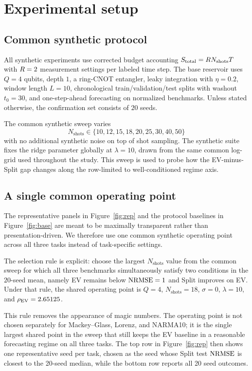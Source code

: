 \section{Experimental setup}
\label{sec:setup}

\subsection{Common synthetic protocol}

All synthetic experiments use corrected budget accounting $S_{\mathrm{total}}=R N_{\mathrm{shots}} T$ with $R=2$ measurement settings per labeled time step. The base reservoir uses $Q=4$ qubits, depth $1$, a ring-CNOT entangler, leaky integration with $\eta=0.2$, window length $L=10$, chronological train/validation/test splits with washout $t_0=30$, and one-step-ahead forecasting on normalized benchmarks. Unless stated otherwise, the confirmation set consists of $20$ seeds.

The common synthetic sweep varies
\[
N_{\mathrm{shots}}\in\{10,12,15,18,20,25,30,40,50\}
\]
with no additional synthetic noise on top of shot sampling. The synthetic suite fixes the ridge parameter globally at $\lambda=10$, drawn from the same common log-grid used throughout the study. This sweep is used to probe how the EV-minus-Split gap changes along the row-limited to well-conditioned regime axis.

\subsection{A single common operating point}

The representative panels in Figure~\ref{fig:rep} and the protocol baselines in Figure~\ref{fig:base} are meant to be maximally transparent rather than presentation-driven. We therefore use one common synthetic operating point across all three tasks instead of task-specific settings.

The selection rule is explicit: choose the largest $N_{\mathrm{shots}}$ value from the common sweep for which all three benchmarks simultaneously satisfy two conditions in the $20$-seed mean, namely EV remains below $\mathrm{NRMSE}=1$ and Split improves on EV. Under that rule, the shared operating point is $Q=4$, $N_{\mathrm{shots}}=18$, $\sigma=0$, $\lambda=10$, and $\rho_{\mathrm{EV}}=2.65125$.

This rule removes the appearance of magic numbers. The operating point is not chosen separately for Mackey--Glass, Lorenz, and NARMA10; it is the single largest shared point in the sweep that still keeps the EV baseline in a reasonable forecasting regime on all three tasks. The top row in Figure~\ref{fig:rep} then shows one representative seed per task, chosen as the seed whose Split test $\mathrm{NRMSE}$ is closest to the 20-seed median, while the bottom row reports all 20 seed outcomes.

